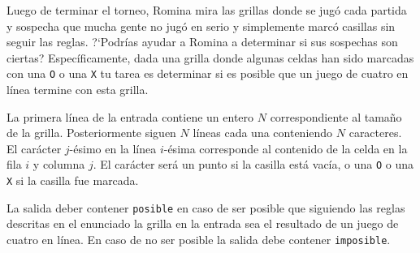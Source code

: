 \documentclass{oci}
\begin{document}
\begin{problemDescription}
\begin{center}
\begin{minipage}{0.8\textwidth}
  \vspace{0.2em}
  \end{minipage}
  \end{center}

  Luego de terminar el torneo, Romina mira
  las grillas donde se jugó cada partida
  y sospecha que mucha gente no jugó en serio y
  simplemente marcó casillas sin seguir las reglas.
  ?`Podrías ayudar a Romina a determinar si sus sospechas
  son ciertas?
  Específicamente, dada una grilla donde algunas
  celdas han sido marcadas con una \texttt{O} o una \texttt{X}
  tu tarea es determinar si es posible que un juego de cuatro en
  línea termine con esta grilla.
\end{problemDescription}

\begin{inputDescription}
  La primera línea de la entrada contiene un entero $N$ correspondiente
  al tamaño de la grilla.
  Posteriormente siguen $N$ líneas cada una conteniendo $N$ caracteres.
  El carácter $j$-ésimo en la línea $i$-ésima corresponde al contenido
  de la celda en la fila $i$ y columna $j$.
  El carácter será un punto si la casilla está vacía, o
  una \texttt{O} o una \texttt{X} si la casilla fue marcada.
\end{inputDescription}

\begin{outputDescription}
  La salida deber contener \texttt{posible} en caso de ser posible
  que siguiendo las reglas descritas en el enunciado la grilla en la
  entrada sea el resultado de un juego de cuatro en línea.
  En caso de no ser posible la salida debe contener \texttt{imposible}.
\end{outputDescription}
\end{document}
